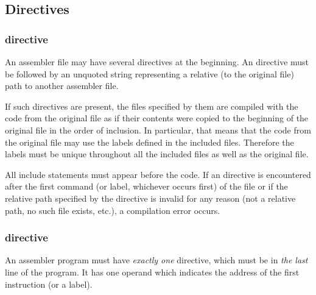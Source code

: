\subsection{Directives}

\subsubsection{ directive}

\vspace{-0.2cm}

An assembler file may have several  directives at the beginning.
An  directive must be followed by an unquoted string
representing a relative (to the original file) path to another assembler file.

If such directives are present, the files specified by them are compiled with
the code from the original file as if their contents were copied to
the beginning of the original file in the order of inclusion.
In particular, that means that the code from the original file may use
the labels defined in the included files.
Therefore the labels must be unique throughout all the included files 
as well as the original file.

All include statements must appear before the code.
If an  directive is encountered after the first command
(or label, whichever occurs first) of the file or if the relative path
specified by the directive is invalid for any reason (not a relative path,
no such file exists, etc.), a compilation error occurs.

\vspace{-0.35cm}

\hypertarget{directives:end}{
	\subsubsection{ directive}
}

\vspace{-0.2cm}

An assembler program must have \textit{exactly one}  directive,
which must be in \textit{the last} line of the program.
It has one operand which indicates the address of the first instruction
(or a label).
